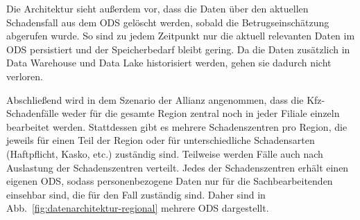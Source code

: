 Die Architektur sieht außerdem vor,
dass die Daten über den aktuellen Schadensfall
aus dem ODS gelöscht werden, sobald die Betrugseinschätzung
abgerufen wurde.
So sind zu jedem Zeitpunkt nur die aktuell relevanten Daten
im ODS persistiert und der Speicherbedarf bleibt gering.
Da die Daten zusätzlich in Data Warehouse und Data Lake
historisiert werden, gehen sie dadurch nicht verloren.

Abschließend wird in dem Szenario der Allianz angenommen,
dass die Kfz-Schadenfälle weder für die gesamte Region
zentral noch in jeder Filiale einzeln bearbeitet werden.
Stattdessen gibt es mehrere Schadenszentren pro Region,
die jeweils für einen Teil der Region 
oder für unterschiedliche Schadensarten (Haftpflicht, Kasko, etc.) zuständig sind.
Teilweise werden Fälle auch nach Auslastung der Schadenszentren verteilt. 
Jedes der Schadenszentren erhält einen eigenen ODS, sodass 
personenbezogene Daten nur für die Sachbearbeitenden einsehbar sind, 
die für den Fall zuständig sind.
Daher sind in Abb.~\ref{fig:datenarchitektur-regional} mehrere ODS dargestellt.
